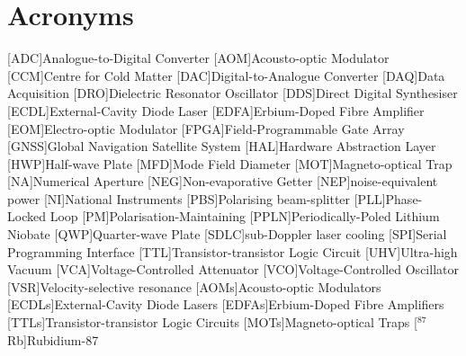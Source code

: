 
\nocite{*}



\chapter*{Acronyms}
\begin{acronym}
        [ADC]{Analogue-to-Digital Converter}
        [AOM]{Acousto-optic Modulator}
        [CCM]{Centre for Cold Matter}
        [DAC]{Digital-to-Analogue Converter}
        [DAQ]{Data Acquisition}
        [DRO]{Dielectric Resonator Oscillator}
        [DDS]{Direct Digital Synthesiser}
        [ECDL]{External-Cavity Diode Laser}
        [EDFA]{Erbium-Doped Fibre Amplifier}
        [EOM]{Electro-optic Modulator}
        [FPGA]{Field-Programmable Gate Array}
        [GNSS]{Global Navigation Satellite System}
        [HAL]{Hardware Abstraction Layer}
        [HWP]{Half-wave Plate}
        [MFD]{Mode Field Diameter}
        [MOT]{Magneto-optical Trap}
        [NA]{Numerical Aperture}
        [NEG]{Non-evaporative Getter}
        [NEP]{noise-equivalent power}
        [NI]{National Instruments}
        [PBS]{Polarising beam-splitter}
        [PLL]{Phase-Locked Loop}
        [PM]{Polarisation-Maintaining}
        [PPLN]{Periodically-Poled Lithium Niobate}
        [QWP]{Quarter-wave Plate}
        [SDLC]{sub-Doppler laser cooling}
        [SPI]{Serial Programming Interface}
        [TTL]{Transistor-transistor Logic Circuit}
        [UHV]{Ultra-high Vacuum}
        [VCA]{Voltage-Controlled Attenuator}
        [VCO]{Voltage-Controlled Oscillator}
        [VSR]{Velocity-selective resonance}
        [AOMs]{Acousto-optic Modulators}
        [ECDLs]{External-Cavity Diode Lasers}
        [EDFAs]{Erbium-Doped Fibre Amplifiers}
        [TTLs]{Transistor-transistor Logic Circuits}
        [MOTs]{Magneto-optical Traps}
        [\(^{87}\)Rb]{Rubidium-87}
    \end{acronym}

